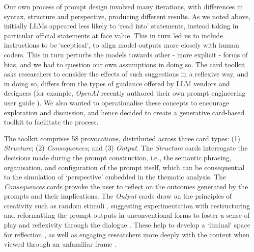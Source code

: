 \documentclass{article}
\begin{document}
Our own process of prompt design involved many iterations, with differences in syntax, structure and perspective, producing different results. As we noted above, initially LLMs appeared less likely to `read into' statements, instead taking in particular official statements at face value. This in turn led us to include instructions to be `sceptical', to align model outputs more closely with human coders. This in turn perturbs the models towards other - more explicit - forms of bias, and we had to question our own assumptions in doing so. The card toolkit asks researchers to consider the effects of such suggestions in a reflexive way, and in doing so, differs from the types of guidance offered by LLM vendors and designers (for example, \emph{OpenAI} recently authored their own prompt engineering user guide \cite{openaiPromptEngineeringGuide2023}).  We also wanted to operationalise these concepts to encourage exploration and discussion, and hence decided to create a generative card-based toolkit to facilitate the process.
 

The toolkit comprises 58 provocations, distributed across three card types: (1) \emph{Structure}; (2) \emph{Consequences}; and (3) \emph{Output}. The \emph{Structure} cards interrogate the decisions made during the prompt construction, i.e., the semantic phrasing, organisation, and configuration of the prompt itself, which can be consequential to the simulation of `perspective' embedded in the thematic analysis. The \emph{Consequences} cards provoke the user to reflect on the outcomes generated by the prompts and their implications. The \emph{Output} cards draw on the principles of creativity such as random stimuli \cite{debonoSeriousCreativityUsing1992}, suggesting experimentation with restructuring and reformatting the prompt outputs in unconventional forms to foster a sense of play and reflexivity through the dialogue \cite{brandtFormattingDesignDialogues2008}. These help to develop a `liminal' space for reflection \cite{turnerLiminalityCommunitas1969}, as well as engaging researchers more deeply with the content when viewed through an unfamiliar frame \cite{haraDesigningDesign2018}. 
\end{document}
